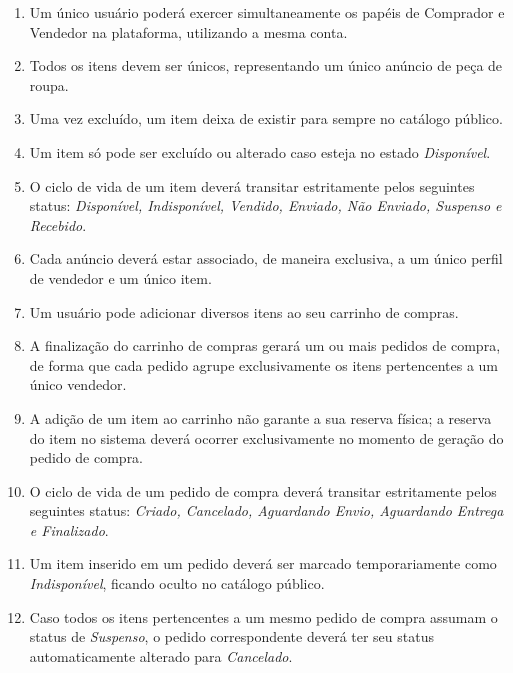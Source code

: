 ﻿\documentclass[12pt,a4paper]{article}
\begin{document}
\begin{enumerate}[label=RD\arabic*:]

    \item Um único usuário poderá exercer simultaneamente os papéis de Comprador e Vendedor na plataforma, utilizando a mesma conta.

    \item Todos os itens devem ser únicos, representando um único anúncio de peça de roupa.

    \item Uma vez excluído, um item deixa de existir para sempre no catálogo público.

    \item Um item só pode ser excluído ou alterado caso esteja no estado \textit{Disponível}.
    
    \item O ciclo de vida de um item deverá transitar estritamente pelos seguintes status: \textit{Disponível, Indisponível, Vendido, Enviado, Não Enviado, Suspenso e Recebido}.

    \item Cada anúncio deverá estar associado, de maneira exclusiva, a um único perfil de vendedor e um único item.

    \item Um usuário pode adicionar diversos itens ao seu carrinho de compras.

    \item A finalização do carrinho de compras gerará um ou mais pedidos de compra, de forma que cada pedido agrupe exclusivamente os itens pertencentes a um único vendedor.

     \item A adição de um item ao carrinho não garante a sua reserva física; a reserva do item no sistema deverá ocorrer exclusivamente no momento de geração do pedido de compra.

    \item O ciclo de vida de um pedido de compra deverá transitar estritamente pelos seguintes status: \textit{Criado, Cancelado, Aguardando Envio, Aguardando Entrega e Finalizado}.

    \item Um item inserido em um pedido deverá ser marcado temporariamente como \textit{Indisponível}, ficando oculto no catálogo público.

    \item Caso todos os itens pertencentes a um mesmo pedido de compra assumam o status de \textit{Suspenso}, o pedido correspondente deverá ter seu status automaticamente alterado para \textit{Cancelado}.


\end{enumerate}
\end{document}
